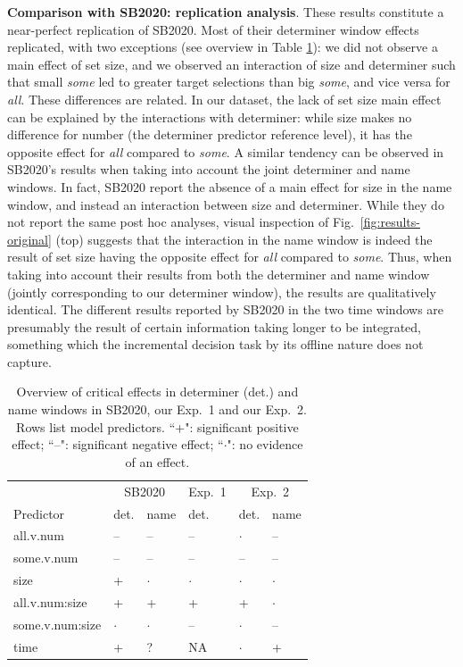\documentclass[10pt,letterpaper]{article}
\newcommand{\tableref}[1]{Table \ref{#1}}
\newcommand{\figref}[1]{Fig.~\ref{#1}}
\newcommand{\jd}[1]{\textcolor{Red}{\textbf{[jd: #1]}}}
\begin{document}
\textbf{Comparison with SB2020: replication analysis}. These results constitute a near-perfect replication of  SB2020. Most of their determiner window effects replicated, with two exceptions (see overview in \tableref{tab:replication}): we did not observe a main effect of set size, and we observed an interaction of size and determiner such that small \emph{some} led to greater target selections than big \emph{some}, and vice versa for \emph{all}. These differences are related. In our dataset, the lack of set size main effect can be explained by the interactions with determiner: while size makes no difference for number (the determiner predictor reference level), it has the opposite effect for \emph{all} compared to \emph{some}. A similar tendency can be observed in SB2020's results when taking into account the joint determiner and name windows. In fact,  SB2020 report the absence of a main effect for size in the name window, and instead an interaction between size and determiner. While they do not report the same post hoc analyses, visual inspection of \figref{fig:results-original} (top) suggests that the interaction in the name window is indeed the result of set size having the opposite effect for \emph{all} compared to \emph{some}. Thus, when taking into account their results from both the determiner and name window (jointly corresponding to our determiner window), the results are qualitatively identical. The different results reported by  SB2020 in the two time windows are presumably the result of certain information taking longer to be integrated, something which the incremental decision task by its offline nature does not capture. %

\begin{table}
\centering
\caption{Overview of critical effects in determiner (det.) and name windows in SB2020, our Exp.~1 and our Exp.~2. Rows list model predictors. ``+": significant positive effect;  ``--": significant negative effect; ``$\cdot$": no evidence of an effect.}
{\small
\begin{tabular}{l l l l l l }
\toprule
& \multicolumn{2}{c}{SB2020} & Exp.~1 & \multicolumn{2}{c}{Exp.~2}\\
Predictor & det. & name & det. & det. & name \\
\midrule
all.v.num & -- &  -- &  -- & $\cdot$ & -- \\
some.v.num & -- &  -- &  -- & -- & -- \\
size & + &  $\cdot$ & $\cdot$ & $\cdot$ & $\cdot$ \\
all.v.num:size & + &  + & + & + & $\cdot$ \\
some.v.num:size & $\cdot$ &  $\cdot$ & -- & $\cdot$ & -- \\
time & + &  ? & NA & $\cdot$ & + \\
\bottomrule
\end{tabular}
}
\label{tab:replication}
\end{table}
\end{document}
